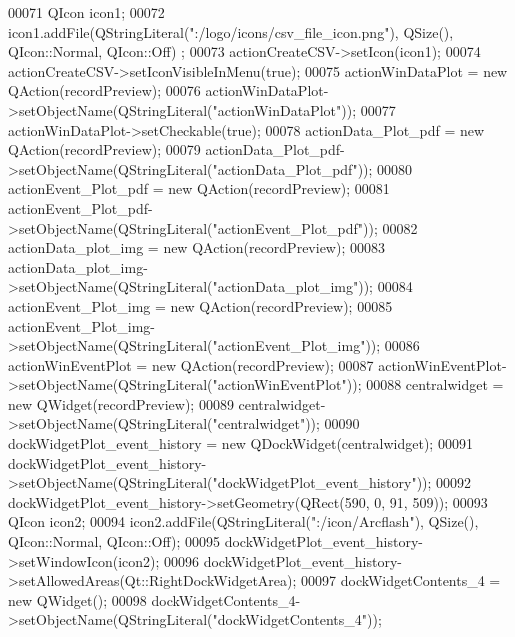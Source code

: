 \begin{DoxyCode}
00071         QIcon icon1;
00072         icon1.addFile(QStringLiteral(\textcolor{stringliteral}{":/logo/icons/csv\_file\_icon.png"}), QSize(), QIcon::Normal, QIcon::Off)
      ;
00073         actionCreateCSV->setIcon(icon1);
00074         actionCreateCSV->setIconVisibleInMenu(\textcolor{keyword}{true});
00075         actionWinDataPlot = \textcolor{keyword}{new} QAction(recordPreview);
00076         actionWinDataPlot->setObjectName(QStringLiteral(\textcolor{stringliteral}{"actionWinDataPlot"}));
00077         actionWinDataPlot->setCheckable(\textcolor{keyword}{true});
00078         actionData\_Plot\_pdf = \textcolor{keyword}{new} QAction(recordPreview);
00079         actionData\_Plot\_pdf->setObjectName(QStringLiteral(\textcolor{stringliteral}{"actionData\_Plot\_pdf"}));
00080         actionEvent\_Plot\_pdf = \textcolor{keyword}{new} QAction(recordPreview);
00081         actionEvent\_Plot\_pdf->setObjectName(QStringLiteral(\textcolor{stringliteral}{"actionEvent\_Plot\_pdf"}));
00082         actionData\_plot\_img = \textcolor{keyword}{new} QAction(recordPreview);
00083         actionData\_plot\_img->setObjectName(QStringLiteral(\textcolor{stringliteral}{"actionData\_plot\_img"}));
00084         actionEvent\_Plot\_img = \textcolor{keyword}{new} QAction(recordPreview);
00085         actionEvent\_Plot\_img->setObjectName(QStringLiteral(\textcolor{stringliteral}{"actionEvent\_Plot\_img"}));
00086         actionWinEventPlot = \textcolor{keyword}{new} QAction(recordPreview);
00087         actionWinEventPlot->setObjectName(QStringLiteral(\textcolor{stringliteral}{"actionWinEventPlot"}));
00088         centralwidget = \textcolor{keyword}{new} QWidget(recordPreview);
00089         centralwidget->setObjectName(QStringLiteral(\textcolor{stringliteral}{"centralwidget"}));
00090         dockWidgetPlot\_event\_history = \textcolor{keyword}{new} QDockWidget(centralwidget);
00091         dockWidgetPlot\_event\_history->setObjectName(QStringLiteral(\textcolor{stringliteral}{"dockWidgetPlot\_event\_history"}));
00092         dockWidgetPlot\_event\_history->setGeometry(QRect(590, 0, 91, 509));
00093         QIcon icon2;
00094         icon2.addFile(QStringLiteral(\textcolor{stringliteral}{":/icon/Arcflash"}), QSize(), QIcon::Normal, QIcon::Off);
00095         dockWidgetPlot\_event\_history->setWindowIcon(icon2);
00096         dockWidgetPlot\_event\_history->setAllowedAreas(Qt::RightDockWidgetArea);
00097         dockWidgetContents\_4 = \textcolor{keyword}{new} QWidget();
00098         dockWidgetContents\_4->setObjectName(QStringLiteral(\textcolor{stringliteral}{"dockWidgetContents\_4"}));

\end{DoxyCode}
